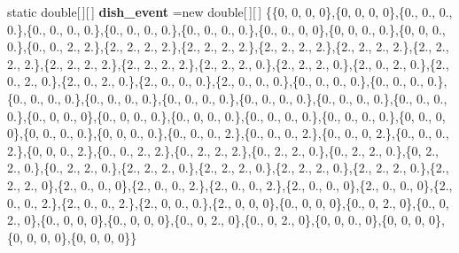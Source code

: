 \begin{DoxyCompactItemize}
\item 
\hypertarget{classuk_1_1ac_1_1dmu_1_1iesd_1_1cascade_1_1util_1_1_initial_profile_gen_utils_a1327c194b88c9a25699a5f9130d4ce90}{static double\mbox{[}$\,$\mbox{]}\mbox{[}$\,$\mbox{]} {\bfseries dish\-\_\-event} =new double\mbox{[}$\,$\mbox{]}\mbox{[}$\,$\mbox{]} \{\{0, 0, 0, 0\},\{0, 0, 0, 0\},\{0., 0., 0., 0.\},\{0., 0., 0., 0.\},\{0., 0., 0., 0.\},\{0., 0., 0., 0.\},\{0., 0., 0, 0\},\{0, 0, 0., 0.\},\{0, 0, 0., 0.\},\{0., 0., 2., 2.\},\{2., 2., 2., 2.\},\{2., 2., 2., 2.\},\{2., 2., 2., 2.\},\{2., 2., 2., 2.\},\{2., 2., 2., 2.\},\{2., 2., 2., 2.\},\{2., 2., 2., 2.\},\{2., 2., 2., 0.\},\{2., 2., 2., 0.\},\{2., 0., 2., 0.\},\{2., 0., 2., 0.\},\{2., 0., 2., 0.\},\{2., 0., 0., 0.\},\{2., 0., 0., 0.\},\{0., 0., 0., 0.\},\{0., 0., 0., 0.\},\{0., 0., 0., 0.\},\{0., 0., 0., 0.\},\{0., 0., 0., 0.\},\{0., 0., 0., 0.\},\{0., 0., 0., 0.\},\{0., 0., 0., 0.\},\{0., 0, 0., 0\},\{0., 0, 0., 0.\},\{0., 0, 0., 0.\},\{0., 0., 0., 0.\},\{0., 0., 0., 0.\},\{0, 0., 0, 0\},\{0, 0., 0., 0.\},\{0, 0, 0., 0.\},\{0., 0., 0., 2.\},\{0., 0., 0., 2.\},\{0., 0., 0, 2.\},\{0., 0., 0., 2.\},\{0, 0, 0., 2.\},\{0., 0., 2., 2.\},\{0., 2., 2., 2.\},\{0., 2., 2., 0.\},\{0., 2., 2., 0.\},\{0, 2., 2., 0.\},\{0., 2., 2., 0.\},\{2., 2., 2., 0.\},\{2., 2., 2., 0.\},\{2., 2., 2., 0.\},\{2., 2., 2., 0.\},\{2., 2., 2., 0\},\{2., 0., 0., 0\},\{2., 0., 0., 2.\},\{2., 0., 0., 2.\},\{2., 0., 0., 0\},\{2., 0., 0., 0\},\{2., 0., 0., 2.\},\{2., 0., 0., 2.\},\{2., 0, 0., 0.\},\{2., 0, 0, 0\},\{0., 0, 0, 0\},\{0., 0, 2., 0\},\{0., 0, 2., 0\},\{0., 0, 0, 0\},\{0., 0, 0, 0\},\{0., 0, 2., 0\},\{0., 0, 2., 0\},\{0, 0, 0., 0\},\{0, 0, 0, 0\},\{0, 0, 0, 0\},\{0, 0, 0, 0\}\}}\label{classuk_1_1ac_1_1dmu_1_1iesd_1_1cascade_1_1util_1_1_initial_profile_gen_utils_a1327c194b88c9a25699a5f9130d4ce90}

\end{DoxyCompactItemize}


